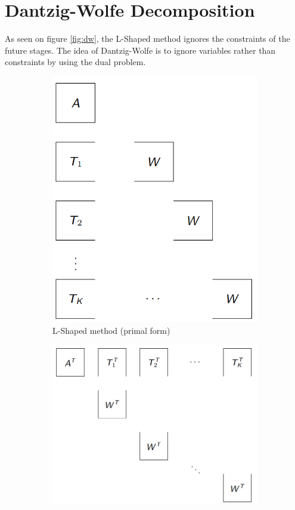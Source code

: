 \documentclass[12pt, openany]{report}
\theoremstyle{definition}
\begin{document}
\chapter{Dantzig-Wolfe Decomposition}
As seen on figure \ref{fig:dw}, the L-Shaped method ignores the constraints of the future stages. The idea of Dantzig-Wolfe is to ignore variables rather than constraints by using the dual problem. 
\begin{figure}[H]
	\centering 
	\begin{subfigure}[b]{.4\textwidth}
		\includegraphics[width=\textwidth]{img/dw_primal.png}
		\caption{L-Shaped method (primal form)}
	\end{subfigure}
	\begin{subfigure}[b]{.5\textwidth}
		\includegraphics[width=\textwidth]{img/dw_dual.png}

\end{subfigure}
\end{figure}
\end{document}
